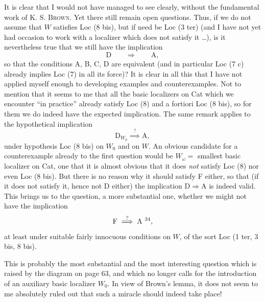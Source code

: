 \documentclass[11pt]{article}
\newcommand{\printedpage}[1]{\marginpar{\footnotesize p.~#1}}
\newcommand{\msp}[1]{\marginpar{\footnotesize [#1]}}
\begin{document}
\leavevmode\printedpage{37}%
It is clear that I would not have managed to see clearly, without the fundamental work of K. S. \textsc{Brown}. Yet there still remain open questions. Thus, if we do not assume that $W$ satisfies Loc (8 bis), but if need be Loc (3 ter) (and I have not yet had occasion to work with a localizer which does not satisfy it \ldots), is it nevertheless true that we still have the implication
\[
\mathrm{D} \qquad \Longrightarrow \qquad \mathrm{A},
\]
so that the conditions A, B, C, D are equivalent (and in particular Loc (7 c) already implies Loc (7) in all its force)? It is clear in all this that
\msp{page 65}%
I have not applied myself enough to developing examples and counterexamples. Not to mention that it seems to me that all the basic localizers on Cat which we encounter ``in practice'' already satisfy Loc (8) and a fortiori Loc (8 bis), so for them we do indeed have the expected implication. The same remark applies to the hypothetical implication
\[
\mathrm{D}_{W_0} \overset{?}{\implies} \mathrm{A},
\]
under hypothesis Loc (8 bis) on $W_0$ and on $W$. An obvious candidate for a counterexample already to the first question would be $W_\omega=$ smallest basic localizer on Cat, one that it is almost obvious that it does \textit{not} satisfy Loc (8) nor even Loc (8 bis). But there is no reason why it should satisfy F either, so that (if it does not satisfy it, hence not D either) the implication $\mathrm{D}\Longrightarrow\mathrm{A}$ is indeed valid. This brings us to the question, a more substantial one, whether we might not have the implication %
\msp{page 66}%
\[
\mathrm{F} \overset{?}{\implies} \mathrm{A}\ \text{\footnotemark[34]},
\]
%
at least under suitable fairly innocuous conditions on $W$, of the sort Loc (1 ter, 3 bis, 8 bis).

This is probably the most substantial and the most interesting question which is raised by the diagram on page 63, and which no longer calls for the introduction of an auxiliary basic localizer $W_0$. In view of Brown's lemma, it does not seem to me absolutely ruled out that such a miracle should indeed take place!
\end{document}
